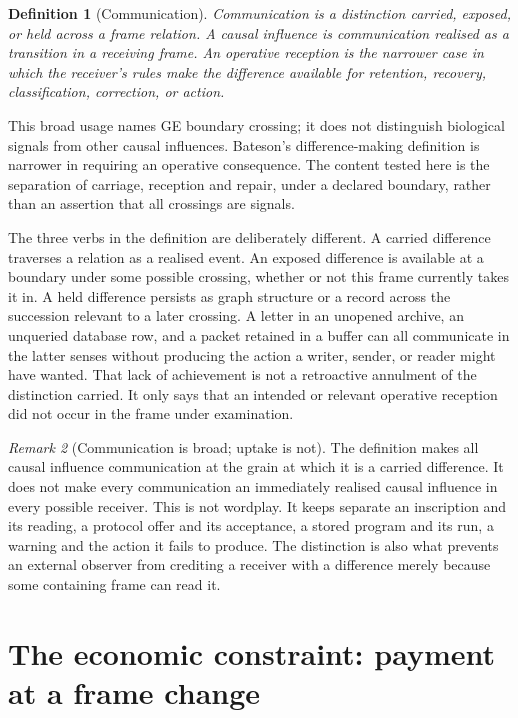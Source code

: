 \documentclass[11pt,a4paper]{article}
\newtheorem{definition}{Definition}[section]
\theoremstyle{remark}\newtheorem{remark}[definition]{Remark}
\begin{document}
\begin{definition}[Communication]\label{def:communication}
Communication is a distinction carried, exposed, or held across a frame relation.
A \emph{causal influence} is communication realised as a transition in a
receiving frame. An \emph{operative reception} is the narrower case in which the
receiver's rules make the difference available for retention, recovery,
classification, correction, or action.
\end{definition}
This broad usage names GE boundary crossing; it does not distinguish biological
signals from other causal influences. Bateson's difference-making definition
\citep{bateson1972} is narrower in requiring an operative consequence. The
content tested here is the separation of carriage, reception and repair, under
a declared boundary, rather than an assertion that all crossings are signals.



The three verbs in the definition are deliberately different. A carried
difference traverses a relation as a realised event. An exposed difference is
available at a boundary under some possible crossing, whether or not this frame
currently takes it in. A held difference persists as graph structure or a record
across the succession relevant to a later crossing. A letter in an unopened
archive, an unqueried database row, and a packet retained in a buffer can all
communicate in the latter senses without producing the action a writer, sender,
or reader might have wanted. That lack of achievement is not a retroactive
annulment of the distinction carried. It only says that an intended or relevant
operative reception did not occur in the frame under examination.

\begin{remark}[Communication is broad; uptake is not]\label{rem:breadth}
The definition makes all causal influence communication at the grain at which it
is a carried difference. It does not make every communication an immediately
realised causal influence in every possible receiver. This is not wordplay. It
keeps separate an inscription and its reading, a protocol offer and its
acceptance, a stored program and its run, a warning and the action it fails to
produce. The distinction is also what prevents an external observer from
crediting a receiver with a difference merely because some containing frame can
read it.
\end{remark}

\section{The economic constraint: payment at a frame change}\label{sec:payment}
\end{document}
